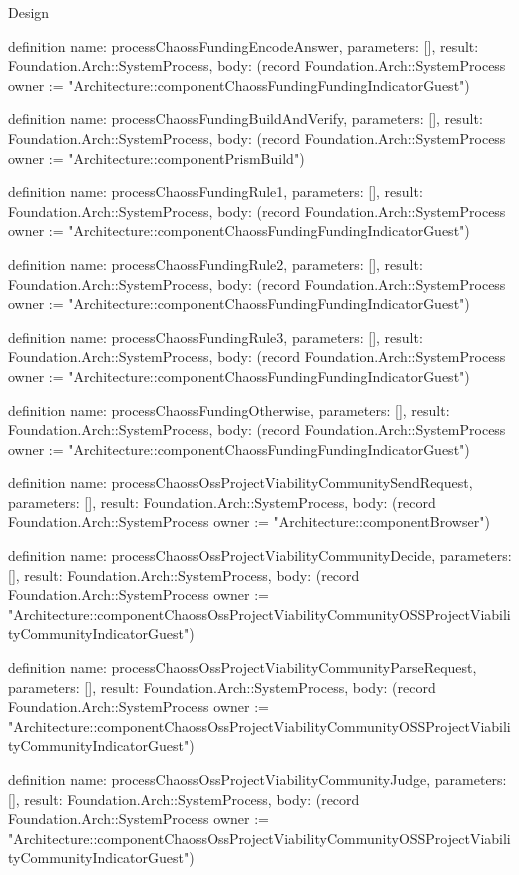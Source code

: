 \begin{lexlean}{Design}
\begin{semanticmodule}
definition{
  name: processChaossFundingEncodeAnswer,
  parameters: [],
  result: Foundation.Arch::SystemProcess,
  body: (record Foundation.Arch::SystemProcess {owner := "Architecture::componentChaossFundingFundingIndicatorGuest"})
}

definition{
  name: processChaossFundingBuildAndVerify,
  parameters: [],
  result: Foundation.Arch::SystemProcess,
  body: (record Foundation.Arch::SystemProcess {owner := "Architecture::componentPrismBuild"})
}

definition{
  name: processChaossFundingRule1,
  parameters: [],
  result: Foundation.Arch::SystemProcess,
  body: (record Foundation.Arch::SystemProcess {owner := "Architecture::componentChaossFundingFundingIndicatorGuest"})
}

definition{
  name: processChaossFundingRule2,
  parameters: [],
  result: Foundation.Arch::SystemProcess,
  body: (record Foundation.Arch::SystemProcess {owner := "Architecture::componentChaossFundingFundingIndicatorGuest"})
}

definition{
  name: processChaossFundingRule3,
  parameters: [],
  result: Foundation.Arch::SystemProcess,
  body: (record Foundation.Arch::SystemProcess {owner := "Architecture::componentChaossFundingFundingIndicatorGuest"})
}

definition{
  name: processChaossFundingOtherwise,
  parameters: [],
  result: Foundation.Arch::SystemProcess,
  body: (record Foundation.Arch::SystemProcess {owner := "Architecture::componentChaossFundingFundingIndicatorGuest"})
}

definition{
  name: processChaossOssProjectViabilityCommunitySendRequest,
  parameters: [],
  result: Foundation.Arch::SystemProcess,
  body: (record Foundation.Arch::SystemProcess {owner := "Architecture::componentBrowser"})
}

definition{
  name: processChaossOssProjectViabilityCommunityDecide,
  parameters: [],
  result: Foundation.Arch::SystemProcess,
  body: (record Foundation.Arch::SystemProcess {owner := "Architecture::componentChaossOssProjectViabilityCommunityOSSProjectViabilityCommunityIndicatorGuest"})
}

definition{
  name: processChaossOssProjectViabilityCommunityParseRequest,
  parameters: [],
  result: Foundation.Arch::SystemProcess,
  body: (record Foundation.Arch::SystemProcess {owner := "Architecture::componentChaossOssProjectViabilityCommunityOSSProjectViabilityCommunityIndicatorGuest"})
}

definition{
  name: processChaossOssProjectViabilityCommunityJudge,
  parameters: [],
  result: Foundation.Arch::SystemProcess,
  body: (record Foundation.Arch::SystemProcess {owner := "Architecture::componentChaossOssProjectViabilityCommunityOSSProjectViabilityCommunityIndicatorGuest"})
}


\end{semanticmodule}
\end{lexlean}
